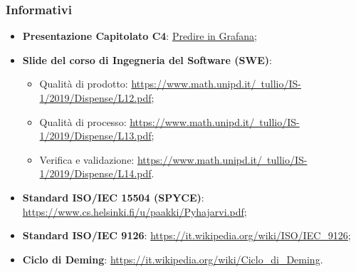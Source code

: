 \documentclass[../piano-di-qualifica.tex]{subfiles}
\begin{document}
\subsubsection{Informativi}%
\label{subs:informativi}
\begin{itemize}
    \item \textbf{Presentazione Capitolato C4}: \href{https://www.math.unipd.it/~tullio/IS-1/2019/Dispense/C4a.pdf}{Predire in Grafana};
    \item \textbf{Slide del corso di Ingegneria del Software (SWE)}:
    \begin{itemize}
        \item Qualità di prodotto: \href{https://www.math.unipd.it/~tullio/IS-1/2019/Dispense/L12.pdf}{https://www.math.unipd.it/~tullio/IS-1/2019/Dispense/L12.pdf};
        \item Qualità di processo: \href{https://www.math.unipd.it/~tullio/IS-1/2019/Dispense/L13.pdf}{https://www.math.unipd.it/~tullio/IS-1/2019/Dispense/L13.pdf};
        \item Verifica e validazione: \href{https://www.math.unipd.it/~tullio/IS-1/2019/Dispense/L14.pdf}{https://www.math.unipd.it/~tullio/IS-1/2019/Dispense/L14.pdf}.
    \end{itemize}
    \item \textbf{Standard ISO/IEC 15504 (SPYCE)}: \href{https://www.cs.helsinki.fi/u/paakki/Pyhajarvi.pdf}{https://www.cs.helsinki.fi/u/paakki/Pyhajarvi.pdf};
    \item \textbf{Standard ISO/IEC 9126}: \href{https://it.wikipedia.org/wiki/ISO/IEC\_9126}{https://it.wikipedia.org/wiki/ISO/IEC\_9126};
    \item \textbf{Ciclo di Deming}: \href{https://it.wikipedia.org/wiki/Ciclo\_di\_Deming}{https://it.wikipedia.org/wiki/Ciclo\_di\_Deming}.
\end{itemize}
\end{document}
